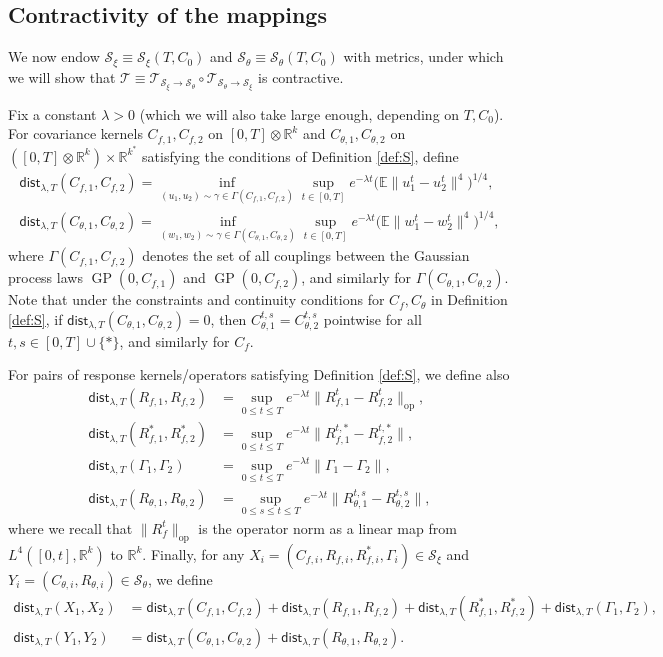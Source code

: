 \documentclass[11pt,letterpaper,reqno]{amsart}
\theoremstyle{definition}
\def\E{\mathbb{E}}
\def\R{\mathbb{R}}
\def\GP{\operatorname{GP}}
\def\cS{\mathcal{S}}
\def\trsfrm{\mathcal{T}}
\def\trsfrmA{\mathcal{T}_{\mathcal{S}_\xi \to {\mathcal{S}}_\theta}}
\def\trsfrmB{\mathcal{T}_{{\mathcal{S}}_\theta \to \mathcal{S}_\xi}}
\newcommand{\lbddst}[2]{\mathsf{dist}_{\lambda,T}(#1,#2)}
\newcommand{\norm}[1]{\|#1\|}
\newcommand{\normop}[1]{\|#1\|_{\mathrm{op}}}
\begin{document}
\subsection{Contractivity of the mappings}\label{sec:contractivity}

We now endow $\mathcal{S}_\xi \equiv \cS_\xi(T,C_0)$ and ${\mathcal{S}}_\theta
\equiv \cS_\theta(T,C_0)$ with metrics, under which we will show that
$\trsfrm \equiv \trsfrmA \circ \trsfrmB$ is contractive.

Fix a constant $\lambda>0$ (which we will also take large enough, depending
on $T,C_0$). For covariance kernels $C_{f,1},C_{f,2}$ on $[0,T] \otimes
\R^k$ and $C_{\theta,1},C_{\theta,2}$ on $([0,T] \otimes \R^k) \times \R^{k^*}$
satisfying the conditions of Definition \ref{def:S}, define
\begin{align*}
\lbddst{C_{f,1}}{C_{f,2}}=\inf_{(u_1,u_2) \sim \gamma \in
\Gamma(C_{f,1},C_{f,2})} \sup_{t \in [0,T]} e^{-\lambda t} \big(\E {\norm{u^t_1 -
u^t_2}^4}\big)^{1/4},\\
\lbddst{C_{\theta,1}}{C_{\theta,2}}=\inf_{(w_1,w_2) \sim \gamma \in
\Gamma(C_{\theta,1},C_{\theta,2})} \sup_{t \in [0, T]} e^{-\lambda t} \big(\E
\norm{w^t_1 - w^t_2}^4\big)^{1/4},
\end{align*}
where $\Gamma(C_{f,1},C_{f,2})$ denotes the set of all couplings between the
Gaussian process laws $\GP(0,C_{f,1})$ and $\GP(0,C_{f,2})$, and similarly for
$\Gamma(C_{\theta,1},C_{\theta,2})$. Note that under the constraints and
continuity conditions for $C_f,C_\theta$ in Definition \ref{def:S}, if 
$\lbddst{C_{\theta,1}}{C_{\theta,2}}=0$, then
$C_{\theta,1}^{t,s}=C_{\theta,2}^{t,s}$ pointwise for all $t,s \in [0,T]
\cup \{*\}$, and similarly for $C_f$.

For pairs of response kernels/operators satisfying Definition \ref{def:S}, we
define also
\begin{align*}
    \lbddst{R_{f,1}}{R_{f,2}} &= \sup_{0 \leq t \leq T} e^{-\lambda t}
\normop{R_{f,1}^t - R_{f,2}^t},\\
    \lbddst{R_{f,1}^*}{R_{f,2}^*} &= \sup_{0 \leq t \leq T} e^{-\lambda t}
\norm{R_{f,1}^{t,*} - R_{f,2}^{t,*}},\\
    \lbddst{\Gamma_1}{\Gamma_2} &= \sup_{0 \leq t \leq T} e^{-\lambda t}
\norm{\Gamma_1 - \Gamma_2},\\
    \lbddst{R_{\theta,1}} {R_{\theta,2}} &= \sup_{0 \leq s\leq t \leq T}
e^{-\lambda t} \norm{R_{\theta,1}^{t,s} - R_{\theta,2}^{t,s}},
\end{align*}
where we recall that $\normop{R_f^t}$ is the operator norm as a linear map
from $L^4([0,t],\R^k)$ to $\R^k$.
Finally, for any $X_i=(C_{f,i},R_{f,i},R_{f,i}^*,\Gamma_i) \in \mathcal{S}_\xi$
and $Y_i=(C_{\theta,i},R_{\theta,i}) \in {\mathcal{S}}_\theta$, we define 
\begin{subequations}
\begin{align*}
	\lbddst{X_1}{X_2} & = \lbddst{C_{f,1}}{C_{f,2}} +
\lbddst{R_{f,1}}{R_{f,2}} + \lbddst{R_{f,1}^*}{R_{f,2}^*}
+ \lbddst{\Gamma_1}{\Gamma_2},\\
	\lbddst{Y_1}{Y_2} & = \lbddst{C_{\theta,1}}{C_{\theta,2}}
+\lbddst{R_{\theta,1}}{R_{\theta,2}}.
\end{align*}
\end{subequations}
\end{document}
